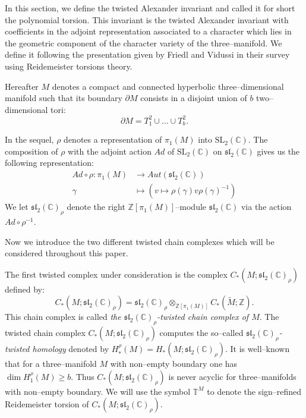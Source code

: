 \documentclass[a4paper]{amsart}
\theoremstyle{plain}
\theoremstyle{definition}
\theoremstyle{remark}
\newcommand{\ZZ}{{\mathbb Z}}
\newcommand{\CC}{{\mathbb C}}
\newcommand{\SL}{{\mathrm{SL}_2(\CC)}}
\newcommand{\sll}{\mathfrak{sl}_2(\CC)}
\newcommand{\sllrho}{\mathfrak{sl}_2(\CC)_\rho}
\newcommand{\RTors}[2]{\mathbb{T}^{#1}_{#2}}
\newcommand{\ucover}[1]{\widetilde{#1}}
\begin{document}
In this section, we define the twisted Alexander invariant and called it for short the polynomial torsion. This invariant is the twisted Alexander invariant with coefficients in the adjoint representation associated to a character which lies in the geometric component of the character variety of the three--manifold. We define it following the presentation given by Friedl and Vidussi in their survey~\cite{FriedlVidussi:survey} using Reidemeister torsions theory. 

Hereafter $M$ denotes a compact and connected hyperbolic three--dimensional
manifold such that its boundary $\partial M$ consists in a disjoint
union of $b$ two--dimensional tori: $$\partial M = T^2_1 \cup \ldots \cup T^2_b.$$

In the sequel,  $\rho$ denotes a representation of $\pi_1(M)$ into $\SL$.
The composition of $\rho$ with the adjoint action $Ad$ of $\SL$ on $\sll$ 
gives us the following representation:
\begin{align*}
  Ad \circ \rho \colon \pi_1(M) &\to Aut(\sll) \\
 \gamma &\mapsto (v \mapsto \rho(\gamma) v \rho(\gamma)^{-1})
\end{align*}
We let $\sllrho$ denote the right $\ZZ[\pi_1(M)]$--module $\sll$ 
via the action $Ad \circ \rho^{-1}$.

Now we introduce the two different twisted chain complexes which will be considered throughout this paper. 

 The first twisted complex under consideration is the complex $C_*(M; \sllrho)$ defined by:
 \begin{equation}
  C_*(M; \sllrho) = \sllrho \otimes_{\ZZ[\pi_1(M)]} C_*(\ucover{M}; \ZZ).
\end{equation}
This chain complex is called {\it the $\sllrho$-twisted
  chain complex of $M$}. The twisted chain complex $C_*(M; \sllrho)$ computes the so--called {\it 
  $\sllrho$-twisted homology} 
 denoted by 
$H_*^\rho(M) = H_*(M; \sll_\rho)$.  It is well--known that for a three--manifold $M$ with non--empty boundary one has $\dim H_1^\rho(M) \geqslant b$. Thus $C_*(M; \sllrho)$ is never acyclic for three--manifolds with non--empty boundary. We will use the symbol $\RTors{M}{}$
to denote the sign--refined Reidemeister torsion of $C_*(M;\sllrho)$.
\end{document}
